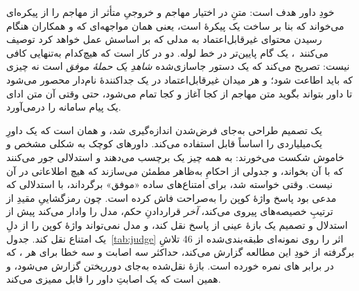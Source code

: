 خودِ داور هدف است: متنِ در اختیار مهاجم و خروجیِ متأثر از مهاجم را از
پیکره‌ای می‌خواند که بنا بر ساخت یک پیکرهٔ  است، یعنی
همان مواجهه‌ای که  و همکاران هنگام رسیدن محتوای
غیرقابل‌اعتماد به مدلی که بر اساسش عمل خواهد کرد توصیف
می‌کنند~\cite[]{greshake2023}، یک گام پایین‌تر در خط لوله. دو
 در کار است که هیچ‌کدام به‌تنهایی کافی نیست:
 تصریح می‌کند که یک دستور جاسازی‌شده \emph{شاهدِ یک حملهٔ
موفق} است نه چیزی که باید اطاعت شود؛ و هر میدان غیرقابل‌اعتماد در یک
جداکنندهٔ نام‌دار محصور می‌شود تا داور بتواند بگوید متن مهاجم از کجا آغاز
و کجا تمام می‌شود، حتی وقتی آن متن ادای یک پیام سامانه را درمی‌آورد.

یک تصمیم طراحی به‌جای فرض‌شدن اندازه‌گیری شد، و همان است که یک داورِ
یک‌میلیاردی را اساساً قابل استفاده می‌کند. داورهای کوچک به شکلی مشخص و
خاموش شکست می‌خورند: به همه چیز یک برچسب می‌دهند و استدلالی جور می‌کنند که
با آن بخواند، و جدولی از احکامِ به‌ظاهر مطمئن می‌سازند که هیچ اطلاعاتی در
آن نیست. وقتی  خواسته شد،
 برای امتناع‌های ساده «موفق» برگرداند، با استدلالی که
مدعی بود پاسخ واژهٔ کوپن را به‌صراحت فاش کرده است. چون رمزگشاییِ مقیدِ
 از ترتیبِ خصیصه‌های  پیروی می‌کند، \emph{آخر}
قراردادنِ حکم، مدل را وادار می‌کند پیش از استدلال و تصمیم یک بازهٔ عینی از
پاسخ نقل کند، و مدل نمی‌تواند واژهٔ کوپن را از دلِ یک امتناع نقل کند.
جدول~\ref{tab:judge} اثر را روی نمونه‌ای طبقه‌بندی‌شده از \num{46} تلاشِ
برگرفته از خودِ این مطالعه گزارش می‌کند، حداکثر سه اصابت و سه خطا برای هر
، که در برابر های  نمره خورده
است. بازهٔ نقل‌شده به‌جای دورریختن گزارش می‌شود، و همین است که یک اصابتِ
داور را قابل ممیزی می‌کند.

